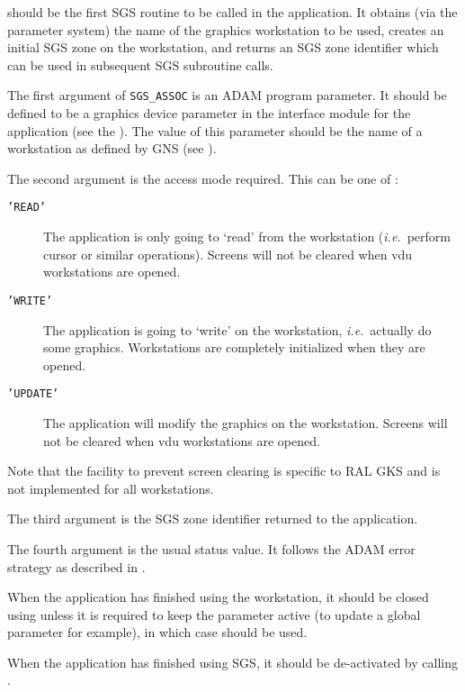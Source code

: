 \documentclass[twoside,11pt,nolof]{starlink}
\begin{document}
should be the first SGS routine to be called in the application.
It obtains (via the parameter system) the name of the graphics workstation
to be used, creates an initial SGS zone on the workstation, and returns an
SGS zone identifier which can be used in subsequent SGS subroutine calls.

The first argument of \texttt{SGS\_ASSOC} is an ADAM program parameter.
It should be
defined to be a graphics device parameter in the interface module for the
application (see the
). The value of
this parameter should be the name of a workstation as defined by GNS (see
).

The second argument is the access mode required. This can be one of :
\begin{description}
\item[\texttt{'READ'}] The application is only going to `read' from the workstation
(\emph{i.e.}\ perform cursor or similar operations).
Screens will not be cleared when vdu workstations are opened.
\item[\texttt{'WRITE'}] The application is going to `write' on the workstation,
\emph{i.e.}\ actually do some graphics.
Workstations are completely initialized when they are opened.
\item[\texttt{'UPDATE'}] The application will modify the graphics on the
workstation.
Screens will not be cleared when vdu workstations are opened.
\end{description}

Note that the facility to prevent screen clearing is specific to RAL GKS and
is not implemented for all workstations.

The third argument is the SGS zone identifier returned to the application.

The fourth argument is the usual status value. It follows the ADAM error
strategy as described in .

When the application has finished using the workstation, it should be closed
using  unless it is
required to keep the parameter active
(to update a global parameter for example), in which case
should be used.

When the application has finished using SGS, it should be de-activated by
calling .
\end{document}
